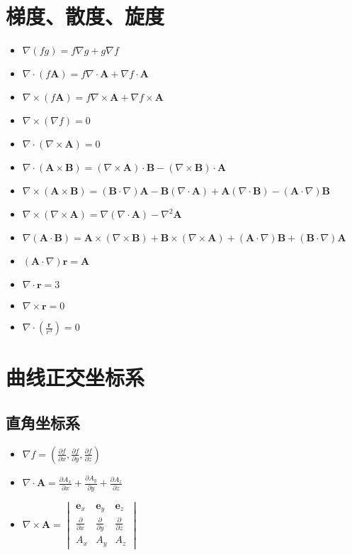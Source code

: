 \documentclass{ctexart}
\begin{document}
\section{梯度、散度、旋度}
\begin{itemize}
\item   $ \nabla(fg) = f \nabla g + g \nabla f $
\item	$ \nabla \cdot (f\mathbf{A}) = f \nabla \cdot \mathbf{A} + \nabla f \cdot \mathbf{A} $
\item	$ \nabla \times (f \mathbf{A}) = f \nabla \times \mathbf{A} + \nabla f \times \mathbf{A} $
\item	$ \nabla \times (\nabla f) = 0 $ 
\item	$ \nabla \cdot (\nabla \times \mathbf{A}) = 0 $
\item	$ \nabla \cdot (\mathbf{A}\times\mathbf{B})=(\nabla\times\mathbf{A})\cdot\mathbf{B}-(\nabla \times \mathbf{B})\cdot\mathbf{A} $
\item	$ \nabla\times(\mathbf{A}\times\mathbf{B})=(\mathbf{B}\cdot\nabla)\mathbf{A}-\mathbf{B}(\nabla\cdot\mathbf{A})+\mathbf{A}(\nabla\cdot\mathbf{B})-(\mathbf{A}\cdot\nabla)\mathbf{B} $
\item	$ \nabla\times(\nabla\times\mathbf{A})=\nabla(\nabla\cdot\mathbf{A})-\nabla^2\mathbf{A}$
\item	$ \nabla(\mathbf{A}\cdot\mathbf{B})=\mathbf{A}\times(\nabla\times\mathbf{B})+\mathbf{B}\times(\nabla\times\mathbf{A})+(\mathbf{A}\cdot\nabla)\mathbf{B}+(\mathbf{B}\cdot\nabla)\mathbf{A} $
\item	$ (\mathbf{A}\cdot\nabla)\mathbf{r}=\mathbf{A} $
\item	$ \nabla\cdot\mathbf{r}=3 $
\item	$ \nabla\times\mathbf{r}=0 $
\item	$ \nabla\cdot(\frac{\mathbf{r}}{r^3})=0$
\end{itemize}

\section{曲线正交坐标系}
\subsection{直角坐标系}
\begin{itemize}
\item	$ \nabla f =( \frac{\partial f}{\partial x},\frac{\partial f}{\partial y},\frac{\partial f}{\partial z}) $
\item	$ \nabla\cdot\mathbf{A}=\frac{\partial A_x}{\partial x}+\frac{\partial A_y}{\partial y}+\frac{\partial A_z}{\partial z} $
\item	$ \nabla\times\mathbf{A} = 
		\begin{vmatrix} 
			\mathbf{e}_x & \mathbf{e}_y & \mathbf{e}_z \\ 
			\frac{\partial}{\partial x} & \frac{\partial}{\partial y} & \frac {\partial}{\partial z} \\ 
			A_x & A_y & A_z
		\end{vmatrix} 
	$
\end{itemize}
\end{document}
